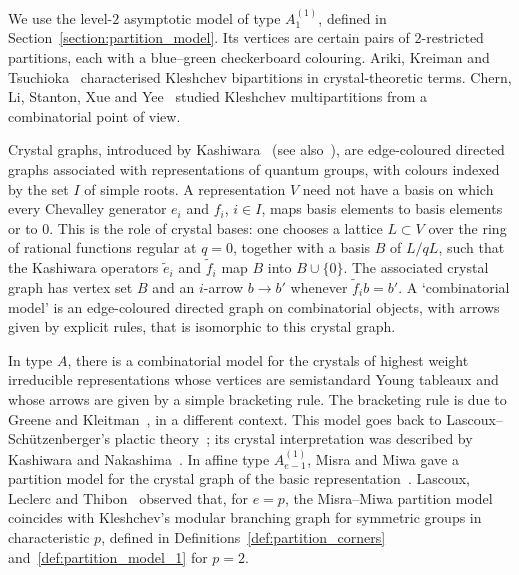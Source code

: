 \documentclass[11pt]{article}
\theoremstyle{definition}
\theoremstyle{remark}
\theoremstyle{definition}
\numberwithin{equation}{section}
\begin{document}
We use the level-$2$ asymptotic model of type $A_1^{(1)}$, defined in Section~\ref{section:partition_model}. Its vertices are certain pairs of $2$-restricted partitions, each with a blue--green checkerboard colouring. Ariki, Kreiman and Tsuchioka~\cite[Theorem~9.5]{AKT08} characterised Kleshchev bipartitions in crystal-theoretic terms. Chern, Li, Stanton, Xue and Yee~\cite[Theorem~1.2 and Corollary~1.3]{CLSXY24} studied Kleshchev multipartitions from a combinatorial point of view.

Crystal graphs, introduced by Kashiwara~\cite[\S4, p.~252, and \S6, p.~255]{Kas90} (see also~\cite{Kas91}), are edge-coloured directed graphs associated with representations of quantum groups, with colours indexed by the set \(I\) of simple roots. A representation \(V\) need not have a basis on which every Chevalley generator \(e_i\) and \(f_i\), \(i\in I\), maps basis elements to basis elements or to \(0\). This is the role of crystal bases: one chooses a lattice \(L\subset V\) over the ring of rational functions regular at \(q=0\), together with a basis \(B\) of \(L/qL\), such that the Kashiwara operators \(\widetilde e_i\) and \(\widetilde f_i\) map \(B\) into \(B\cup\{0\}\). The associated crystal graph has vertex set \(B\) and an \(i\)-arrow \(b\to b'\) whenever \(\widetilde f_i b=b'\). A `combinatorial model' is an edge-coloured directed graph on combinatorial objects, with arrows given by explicit rules, that is isomorphic to this crystal graph.

In type $A$, there is a combinatorial model for the crystals of highest weight irreducible representations whose vertices are semistandard Young tableaux and whose arrows are given by a simple bracketing rule. The bracketing rule is due to Greene and Kleitman~\cite[Theorems~1 and~7, pp.~82 and~86]{GK76}, in a different context. This model goes back to Lascoux--Schützenberger’s plactic theory~\cite[2.9 and 4.3, pp.~133--134 and~144]{LS81}; its crystal interpretation was described by Kashiwara and Nakashima~\cite[Theorem~3.4.2, p.~309]{KN94}. In affine type $A_{e-1}^{(1)}$, Misra and Miwa gave a partition model for the crystal graph of the basic representation~\cite[Propositions~3.3 and~4.3 and Theorem~4.7, pp.~85, 86 and~88]{MM90}. Lascoux, Leclerc and Thibon~\cite[Proposition~5.2, p.~220]{LLT96} observed that, for \(e=p\), the Misra--Miwa partition model coincides with Kleshchev's modular branching graph for symmetric groups in characteristic \(p\), defined in Definitions~\ref{def:partition_corners} and~\ref{def:partition_model_1} for $p=2$.
\end{document}
